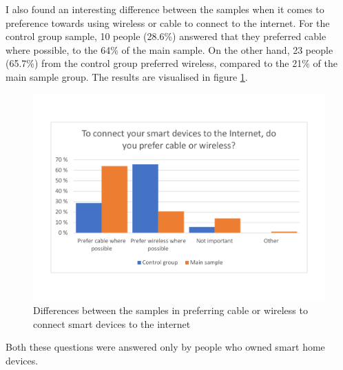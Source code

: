 I also found an interesting difference between the samples when it comes to preference towards using wireless or cable to connect to the internet. For the control group sample, 10 people (28.6\%) answered that they preferred cable where possible, to the 64\% of the main sample. On the other hand, 23 people (65.7\%) from the control group preferred wireless, compared to the 21\% of the main sample group. The results are visualised in figure \ref{fig:controlgroup_cablewireless}. 
\begin{figure}[!h]
    \centering
    \includegraphics[scale=0.40]{figures/diagrams/controlgroup_cablewireless.pdf}
    \caption{Differences between the samples in preferring cable or wireless to connect smart devices to the internet}
    \label{fig:controlgroup_cablewireless}
\end{figure}

Both these questions were answered only by people who owned smart home devices. 

